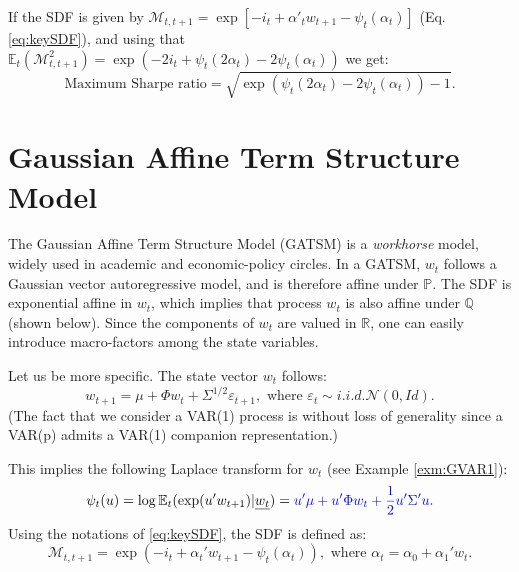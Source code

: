 \documentclass[
  12pt,
]{book}
\theoremstyle{definition}
\theoremstyle{definition}
\theoremstyle{definition}
\theoremstyle{definition}
\theoremstyle{remark}
\begin{document}
If the SDF is given by \(\mathcal{M}_{t,t+1} = \exp[-i_{t}+\alpha'_tw_{t+1}-\psi_t(\alpha_t)]\) (Eq. \eqref{eq:keySDF}), and using that \(\mathbb{E}_t(\mathcal{M}_{t,t+1}^2)=\exp(-2i_t+\psi_t(2\alpha_t)-2\psi_t(\alpha_t))\) we get:
\[
\mbox{Maximum Sharpe ratio} = \sqrt{\exp(\psi_t(2\alpha_t)-2\psi_t(\alpha_t)) - 1}.
\]

\hypertarget{RiskFreeGaussian}{%
\section{Gaussian Affine Term Structure Model}\label{RiskFreeGaussian}}

The Gaussian Affine Term Structure Model (GATSM) is a \emph{workhorse} model, widely used in academic and economic-policy circles. In a GATSM, \(w_t\) follows a Gaussian vector autoregressive model, and is therefore affine under \(\mathbb{P}\). The SDF is exponential affine in \(w_t\), which implies that process \(w_t\) is also affine under \(\mathbb{Q}\) (shown below). Since the components of \(w_t\) are valued in \(\mathbb{R}\), one can easily introduce macro-factors among the state variables.

Let us be more specific. The state vector \(w_t\) follows:
\begin{equation}
w_{t+1} = \mu + \Phi w_{t} + \Sigma^{1/2} \varepsilon_{t+1}, \mbox{ where } \varepsilon_{t} \sim  i.i.d. \mathcal{N}(0,Id).\label{eq:GaussianVAR1}
\end{equation}
(The fact that we consider a VAR(1) process is without loss of generality since a VAR(p) admits a VAR(1) companion representation.)

This implies the following Laplace transform for \(w_t\) (see Example \ref{exm:GVAR1}):
\[
\psi_t(u) = \log \mathbb{E}_t(\exp(u'w_{t+1})|\underline{w_t}) = \color{blue}{u'\mu + u'\Phi w_t + \frac{1}{2}u'\Sigma'u}.
\]
Using the notations of \eqref{eq:keySDF}, the SDF is defined as:
\[
\mathcal{M}_{t,t+1} = \exp(- i_t + \alpha_t'w_{t+1} - \psi_t(\alpha_t)), \mbox{ where } \alpha_t = \alpha_0 + \alpha_1'w_t.
\]
\end{document}
